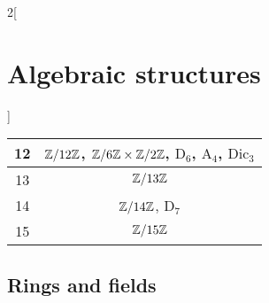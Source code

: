\documentclass[../../../main_math.tex]{subfiles}
\begin{document}
\begin{multicols}{2}[\section{Algebraic structures}]
\begin{center}
\begin{tabular}{|c|c|}
      \hline
      12    & $\quot{\ZZ}{12\ZZ}$, $\quot{\ZZ}{6\ZZ}\times\quot{\ZZ}{2\ZZ}$, $\text{D}_6$, $\text{A}_4$, $\text{Dic}_3$                   \\
      \hline
      13    & $\quot{\ZZ}{13\ZZ}$                                                                                                         \\
      \hline
      14    & $\quot{\ZZ}{14\ZZ}$, $\text{D}_7$                                                                                           \\
      \hline
      15    & $\quot{\ZZ}{15\ZZ}$                                                                                                         \\
      \hline
    \end{tabular}
  \end{center}
  \subsection{Rings and fields}\label{AS:rings_section}

\end{multicols}
\end{document}
